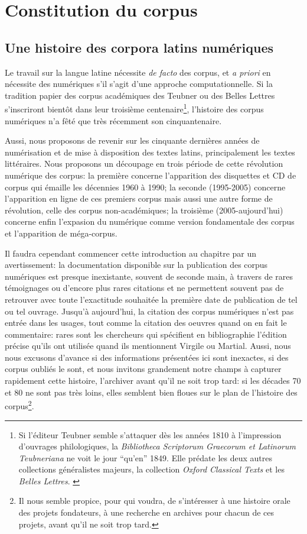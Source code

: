 \chapter{Constitution du corpus}

\section{Une histoire des corpora latins numériques}

Le travail sur la langue latine nécessite \textit{de facto} des corpus, et \textit{a priori} en nécessite des numériques s'il s'agit d'une approche computationnelle. Si la tradition papier des corpus académiques des Teubner ou des Belles Lettres s'inscriront bientôt dans leur troisième centenaire\footnote{Si l'éditeur Teubner semble s'attaquer dès les années 1810 à l'impression d'ouvrages philologiques, la \textit{Bibliotheca Scriptorum Graecorum et Latinorum Teubneriana} ne voit le jour \enquote{qu'en} 1849. Elle prédate les deux autres collections généralistes majeurs, la collection \textit{Oxford Classical Texts} et les \textit{Belles Lettres}. \cite{andre_cent-cinquante_1974}}, l'histoire des corpus numériques n'a fêté que très récemment son cinquantenaire.

Aussi, nous proposons de revenir sur les cinquante dernières années de numérisation et de mise à disposition des textes latins, principalement les textes littéraires. Nous proposons un découpage en trois période de cette révolution numérique des corpus: la première concerne l'apparition des disquettes et CD de corpus qui émaille les décennies 1960 à 1990; la seconde (1995-2005) concerne l'apparition en ligne de ces premiers corpus mais aussi une autre forme de révolution, celle des corpus non-académiques; la troisième (2005-aujourd'hui) concerne enfin l'expasion du numérique comme version fondamentale des corpus et l'apparition de méga-corpus.

Il faudra cependant commencer cette introduction au chapitre par un avertissement: la documentation disponible sur la publication des corpus numériques est presque inexistante, souvent de seconde main, à travers de rares témoignages ou d'encore plus rares citations et ne permettent souvent pas de retrouver avec toute l'exactitude souhaitée la première date de publication de tel ou tel ouvrage. Jusqu'à aujourd'hui, la citation des corpus numériques n'est pas entrée dans les usages, tout comme la citation des oeuvres quand on en fait le commentaire: rares sont les chercheurs qui spécifient en bibliographie l'édition précise qu'ils ont utilisée quand ils mentionnent Virgile ou Martial. Aussi, nous nous excusons d'avance  si des informations présentées ici sont inexactes, si des corpus oubliés le sont, et nous invitons grandement notre champs à capturer rapidement cette histoire, l'archiver avant qu'il ne soit trop tard: si les décades 70 et 80 ne sont pas très loins, elles semblent bien floues sur le plan de l'histoire des corpus\footnote{Il nous semble propice, pour qui voudra, de s'intéresser à une histoire orale des projets fondateurs, à une recherche en archives pour chacun de ces projets, avant qu'il ne soit trop tard.}.


